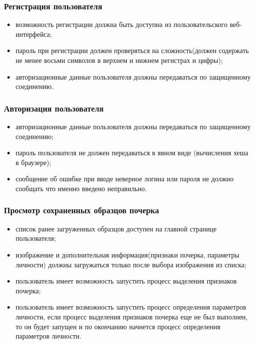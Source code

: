 \subsubsection{Регистрация пользователя}
\label{sec:freq:reg}
\begin{itemize}
	\item возможность регистрации должна быть доступна из пользовательского веб-интерфейса;
	\item пароль при регистрации должен проверяться на сложность(должен содержать не менее восьми символов в верхнем и нижнем регистрах и цифры);
	\item авторизационные данные пользователя должны передаваться по защищенному соединению.
\end{itemize}

\subsubsection{Авторизация пользователя}
\label{sec:freq:auth}
\begin{itemize}
	\item авторизационные данные пользователя должны передаваться по защищенному соединению;
	\item пароль пользователя не должен передаваться в явном виде (вычисления хеша в браузере);
 	\item сообщение об ошибке при вводе неверное логина или пароля не должно сообщать что именно введено неправильно.
\end{itemize}

\subsubsection{Просмотр сохраненных образцов почерка}
\label{sec:freq:show}
\begin{itemize}
	\item список ранее загруженных образцов доступен на главной странице пользователя;
	\item изображение и дополнительная информация(признаки почерка, параметры личности) должны загружаться только после выбора изображения из списка;
	\item пользователь имеет возможность запустить процесс выделения признаков почерка;
	\item пользователь имеет возможность запустить процесс определения параметров личности, если процесс выделения признаков почерка еще не был выполнен, то он будет запущен и по окончанию начнется процесс определения параметров личности.
\end{itemize}


